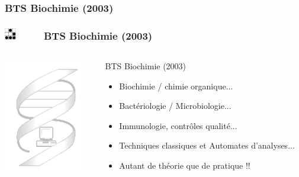 \documentclass[slidetop,11pt]{beamer}
\def\sectionPartIIaUN{BTS Biochimie (2003)}
\def\moreInFrameTitle{\includegraphics[height=0.5cm]{img/logo_glider.png}~~~~~}
\begin{document}
\subsubsection{\sectionPartIIaUN}
\begin{frame}
	\frametitle{\moreInFrameTitle \sectionPartIIaUN}
	\begin{columns}[T]
	\begin{column}[T]{5cm}
		\includegraphics[height=5cm]{img/fondcote.png}
	\end{column}
	\begin{column}[T]{7cm}
		 \begin{beamerboxesrounded}	[lower=substructureUN, %
		 				 upper=block title UN,%
						 shadow=true]%
		       {\sectionPartIIaUN}
			\begin{itemize}
				\item Biochimie / chimie organique... 
				\item Bact{\'e}riologie / Microbiologie... 
				\item Immunologie, contr{\^o}les qualit{\'e}... 
				\item Techniques classiques et Automates d'analyses...
				\item Autant de th{\'e}orie que de pratique !!
			\end{itemize}
		\end{beamerboxesrounded}
	\end{column}
	\end{columns}
\end{frame}
\end{document}

